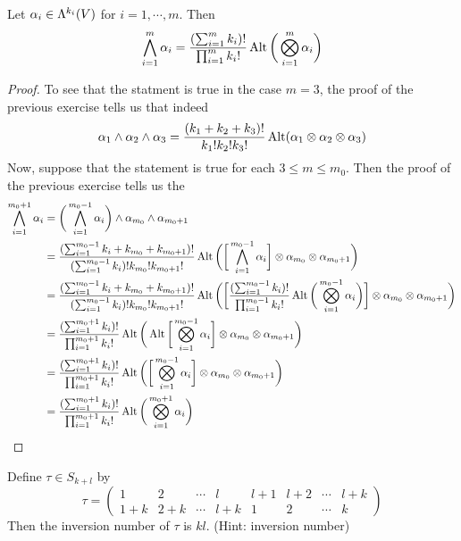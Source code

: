 \documentclass{book}
\begin{document}
	\begin{ex}
		Let $\alpha_i \in \Lambda^{k_i}(V)$ for $i =1, \cdots, m$. Then $$\bigwedge_{i=1}^m \alpha_i = \frac{(\sum_{i=1}^m k_i)!}{\prod_{i=1}^m k_i!} \operatorname{Alt} \bigg(\bigotimes_{i=1}^m \alpha_i \bigg)$$
	\end{ex}

	\begin{proof}
		To see that the statment is true in the case $m=3$, the proof of the previous exercise tells us that indeed $$\alpha_1 \wedge \alpha_2 \wedge \alpha_3 = \frac{(k_1 + k_2 + k_3)!}{k_1! k_2! k_3!}\operatorname{Alt}(\alpha_1 \otimes \alpha_2 \otimes \alpha_3)$$
		Now, suppose that the statement is true for each $3 \leq m \leq m_0$. Then the proof of the previous exercise tells us the 
		\begin{align*}
			\bigwedge_{i=1}^{m_0 +1} \alpha_i
			&= \bigg( \bigwedge_{i=1}^{m_0 -1} \alpha_i \bigg) \wedge \alpha_{m_0} \wedge \alpha_{m_0+1} \\
			&= \frac{(\sum_{i=1}^{m_0-1} k_i + k_{m_0} + k_{m_0+1})! }{(\sum_{i=1}^{m_0-1} k_i)! k_{m_0}! k_{m_0+1}!} \operatorname{Alt} \bigg( \bigg[ \bigwedge_{i=1}^{m_0-1} \alpha_i \bigg] \otimes \alpha_{m_0} \otimes \alpha_{m_0 +1}  \bigg) \\
			&= \frac{(\sum_{i=1}^{m_0-1} k_i + k_{m_0} + k_{m_0+1})! }{(\sum_{i=1}^{m_0-1} k_i)! k_{m_0}! k_{m_0+1}!} \operatorname{Alt} \bigg( \bigg[ \frac{(\sum_{i=1}^{m_0-1} k_i)!}{\prod_{i=1}^{m_0-1} k_i!} \operatorname{Alt} \bigg (\bigotimes_{i=1}^{m_0-1} \alpha_i \bigg) \bigg] \otimes \alpha_{m_0} \otimes \alpha_{m_0 +1}  \bigg) \\
			&= \frac{(\sum_{i=1}^{m_0+1} k_i)! }{ \prod_{i=1}^{m_0+1} k_i!}\operatorname{Alt} \bigg( \operatorname{Alt} \bigg [ \bigotimes_{i=1}^{m_0-1} \alpha_i \bigg] \otimes \alpha_{m_0} \otimes \alpha_{m_0 +1}  \bigg) \\
			&= \frac{(\sum_{i=1}^{m_0+1} k_i)! }{ \prod_{i=1}^{m_0+1} k_i!}\operatorname{Alt} \bigg( \bigg [ \bigotimes_{i=1}^{m_0-1} \alpha_i \bigg] \otimes \alpha_{m_0} \otimes \alpha_{m_0 +1}  \bigg) \\
			&= \frac{(\sum_{i=1}^{m_0+1} k_i)! }{ \prod_{i=1}^{m_0+1} k_i!}\operatorname{Alt} \bigg(  \bigotimes_{i=1}^{m_0+1} \alpha_i   \bigg) 
		\end{align*}
	\end{proof}
	
	\begin{ex}
		Define $\tau \in S_{k+l}$ by 
		\[\tau = 
		\begin{pmatrix}
			1 & 2 & \cdots &l &l+1 & l+2 & \cdots & l+k \\
			1+k & 2+ k & \cdots & l+k & 1 & 2 & \cdots & k 
		\end{pmatrix} 
		\]
		Then the inversion number of $\tau$ is $kl$.
		(Hint: inversion number)
	\end{ex}
\end{document}
